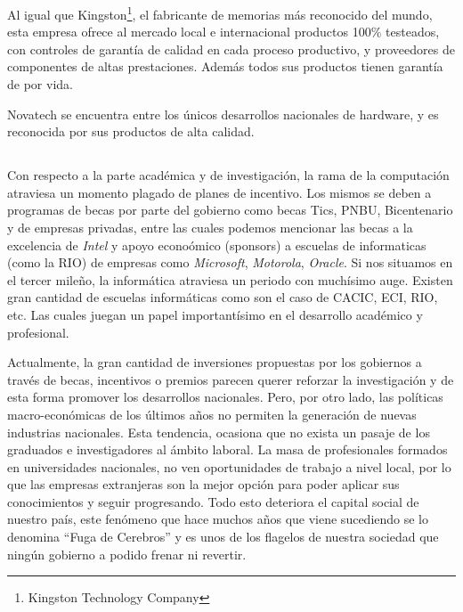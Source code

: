 \documentclass[%
 	final,
%
	notitlepage,
	narroweqnarray,
	inline,
 	twoside,
	]{ieee}
\begin{document}
Al igual que Kingston\footnote{Kingston Technology Company\cite{kingston}}, el fabricante de memorias m\'as reconocido del mundo, esta empresa ofrece al mercado local e internacional productos 100\% testeados, con controles de garant\'ia de calidad en cada proceso productivo, y proveedores de componentes de altas prestaciones. Adem\'as todos sus productos tienen garant\'ia de por vida.

Novatech se encuentra entre los \'unicos desarrollos nacionales de hardware, y es reconocida por sus productos de alta calidad.

\subsection*{}
Con respecto a la parte acad\'emica y de investigaci\'on, la rama de la computaci\'on atraviesa un momento plagado de planes de incentivo. Los mismos se deben a programas de becas por parte del gobierno como becas Tics, PNBU, Bicentenario y de empresas privadas, entre las cuales podemos mencionar las becas a la excelencia de \textit{Intel} y apoyo econo\'omico (sponsors) a escuelas de informaticas (como la RIO) de empresas como \textit{Microsoft}, \textit{Motorola}, \textit{Oracle}.
Si nos situamos en el tercer mile\~no, la inform\'atica atraviesa un periodo con much\'isimo auge. Existen gran cantidad de escuelas informáticas como son el caso de CACIC, ECI, RIO, etc. Las cuales juegan un papel important\'isimo en el desarrollo acad\'emico y profesional.

Actualmente, la gran cantidad de inversiones propuestas por los gobiernos a trav\'es de becas, incentivos o premios parecen querer reforzar la investigaci\'on y de esta forma promover los desarrollos nacionales. Pero, por otro lado, las pol\'iticas macro-econ\'omicas de los \'ultimos a\~nos no permiten la generaci\'on de nuevas industrias nacionales. Esta tendencia, ocasiona que no exista un pasaje de los graduados e investigadores al \'ambito laboral. La masa de profesionales formados en universidades nacionales, no ven oportunidades de trabajo a nivel local, por lo que las empresas extranjeras son la mejor opci\'on para poder aplicar sus conocimientos y seguir progresando. Todo esto deteriora el capital social de nuestro pa\'is, este fen\'omeno que hace muchos a\~nos que viene sucediendo se lo denomina ``Fuga de Cerebros'' y es unos de los flagelos de nuestra sociedad que ning\'un gobierno a podido frenar ni revertir.

\end{document}
